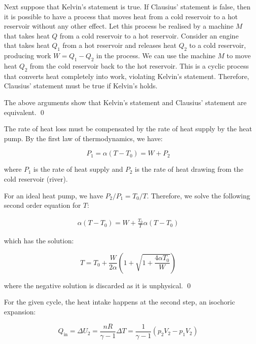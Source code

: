 \documentclass[12pt]{article}
\begin{document}
Next suppose that Kelvin's statement is true. If Clausius' statement is false, then it is possible to have a process that moves heat from a cold reservoir to a hot reservoir without any other effect. Let this process be realised by a machine $M$ that takes heat $Q$ from a cold reservoir to a hot reservoir. Consider an engine that takes heat $Q_{1}$ from a hot reservoir and releases heat $Q_{2}$ to a cold reservoir, producing work $W = Q_{1} - Q_{2}$ in the process. We can use the machine $M$ to move heat $Q_{2}$ from the cold reservoir back to the hot reservoir. This is a cyclic process that converts heat completely into work, violating Kelvin's statement. Therefore, Clausius' statement must be true if Kelvin's holds.

The above arguments show that Kelvin's statement and Clausius' statement are equivalent.
\qed


The rate of heat loss must be compensated by the rate of heat supply by the heat pump. By the first law of thermodynamics, we have:

\begin{equation}
    P_{1} = \alpha(T - T_{0}) = W + P_{2}
\end{equation}

where $P_{1}$ is the rate of heat supply and $P_{2}$ is the rate of heat drawing from the cold reservoir (river).

For an ideal heat pump, we have $P_{2}/P_{1} = T_{0}/T$. Therefore, we solve the following second order equation for $T$:

\begin{equation}
\begin{split}
    \alpha(T - T_{0}) = W + \frac{T_{0}}{T} \alpha(T - T_{0})
\end{split}
\end{equation}

which has the solution:

\begin{equation}
    T = T_{0} + \frac{W}{2\alpha} \left( 1 + \sqrt{1 + \frac{4\alpha T_{0}}{W}} \right)
\end{equation}

where the negative solution is discarded as it is unphysical.
\qed


For the given cycle, the heat intake happens at the second step, an isochoric expansion:

\begin{equation}
    Q_{\text{in}} = \Delta U_{2} = \frac{nR}{\gamma - 1} \Delta T = \frac{1}{\gamma - 1} (p_{2}V_{2} - p_{1}V_{2})
\end{equation}
\end{document}
